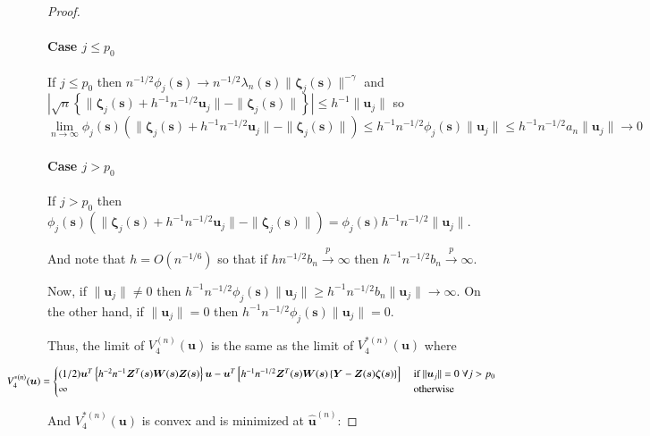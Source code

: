 \documentclass[authoryear, review, 11pt]{elsarticle}
\begin{document}
\begin{proof}
            \paragraph{Case $j \le p_0$}
            If $j \le p_0$ then $n^{-1/2} \phi_j(\bm{s}) \to n^{-1/2} \lambda_n(\bm{s}) \| \bm{\zeta}_j(\bm{s}) \|^{-\gamma}$ and $| \sqrt{n} \left\{ \|\bm{\zeta}_j(\bm{s}) + h^{-1} n^{-1/2} \bm{u}_j \| - \| \bm{\zeta}_j(\bm{s}) \| \right\} | \le h^{-1} \| \bm{u}_j \|$ so $\lim \limits_{n \to \infty} \phi_j(\bm{s}) \left( \|\bm{\zeta}_j(\bm{s}) + h^{-1} n^{-1/2} \bm{u}_j \| - \| \bm{\zeta}_j(\bm{s}) \| \right) \le h^{-1} n^{-1/2} \phi_j(\bm{s})  \| \bm{u}_j \| \le h^{-1} n^{-1/2} a_n \| \bm{u}_j \| \to 0$

            \paragraph{Case $j > p_0$}
            If $j > p_0$ then $\phi_j(\bm{s}) \left( \|\bm{\zeta}_j(\bm{s}) + h^{-1} n^{-1/2} \bm{u}_j \| - \| \bm{\zeta}_j(\bm{s}) \| \right) = \phi_j(\bm{s}) h^{-1} n^{-1/2} \| \bm{u}_j \| $. 
        
            And note that $h = O(n^{-1/6})$ so that if $h n^{-1/2} b_n \xrightarrow{p} \infty$ then $h^{-1} n^{-1/2} b_n \xrightarrow{p} \infty$.
        
            Now, if $\| \bm{u}_j \| \ne 0$ then $h^{-1} n^{-1/2} \phi_j(\bm{s}) \| \bm{u}_j \| \ge h^{-1} n^{-1/2} b_n \| \bm{u}_j \| \to \infty$. On the other hand, if $\| \bm{u}_j \| = 0$ then $h^{-1} n^{-1/2} \phi_j(\bm{s}) \| \bm{u}_j \| = 0$.

            Thus, the limit of $V_4^{(n)} (\bm{u})$ is the same as the limit of $V_4^{*(n)} (\bm{u})$ where

            \begin{equation*}
                \mkern-72muV_4^{*(n)} (\bm{u}) = \begin{cases}(1/2) \bm{u}^T \left\{ h^{-2} n^{-1} \bm{Z}^T(\bm{s}) \bm{W}(\bm{s}) \bm{Z}(\bm{s}) \right\} \bm{u} - \bm{u}^T \left[ h^{-1} n^{-1/2} \bm{Z}^T(\bm{s}) \bm{W}(\bm{s}) \left\{ \bm{Y} - \bm{Z}(\bm{s}) \bm{\zeta}(\bm{s}) \right\} \right] &\mbox{ if } \| \bm{u}_j \| = 0 \; \forall j > p_0 \\ \infty &\mbox{ otherwise } \end{cases}
            \end{equation*}


            And $V_4^{*(n)}(\bm{u})$ is convex and is minimized at $\hat{\bm{u}}^{(n)}$:


\end{proof}
\end{document}
